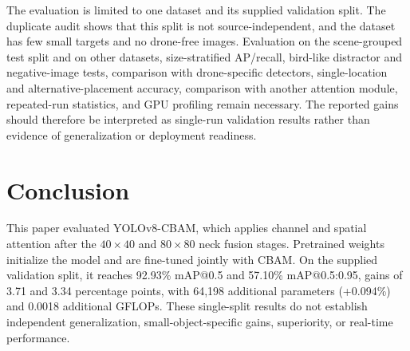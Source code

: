 \documentclass[conference]{IEEEtran}
\begin{document}
The evaluation is limited to one dataset and its supplied validation split. The duplicate audit shows that this split is not source-independent, and the dataset has few small targets and no drone-free images. Evaluation on the scene-grouped test split and on other datasets, size-stratified AP/recall, bird-like distractor and negative-image tests, comparison with drone-specific detectors, single-location and alternative-placement accuracy, comparison with another attention module, repeated-run statistics, and GPU profiling remain necessary. The reported gains should therefore be interpreted as single-run validation results rather than evidence of generalization or deployment readiness.

\section{Conclusion}

This paper evaluated YOLOv8-CBAM, which applies channel and spatial attention after the $40\times40$ and $80\times80$ neck fusion stages. Pretrained weights initialize the model and are fine-tuned jointly with CBAM. On the supplied validation split, it reaches 92.93\% mAP@0.5 and 57.10\% mAP@0.5:0.95, gains of 3.71 and 3.34 percentage points, with 64,198 additional parameters (+0.094\%) and 0.0018 additional GFLOPs. These single-split results do not establish independent generalization, small-object-specific gains, superiority, or real-time performance.
\end{document}
